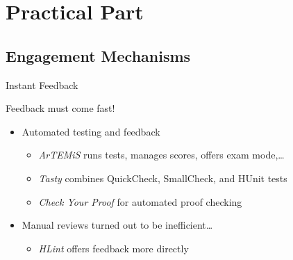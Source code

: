 \documentclass{beamer}
\begin{document}
\section{Practical Part}
\subsection{Engagement Mechanisms}

\begin{frame}{Instant Feedback}
\centerline{\Large{\alert{Feedback must come fast!}}}
\pause
\begin{itemize}[<+->]
\item Automated testing and feedback
\begin{itemize}
  \item \emph{ArTEMiS} runs tests, manages scores, offers exam mode,\dots
  \item \emph{Tasty} combines QuickCheck, SmallCheck, and HUnit tests
  \item \emph{Check Your Proof} for automated proof checking
\end{itemize}
\item Manual reviews turned out to be inefficient\dots
\begin{itemize}
  \item \emph{HLint} offers feedback more directly
\end{itemize}
\end{itemize}
\end{frame}
\end{document}
